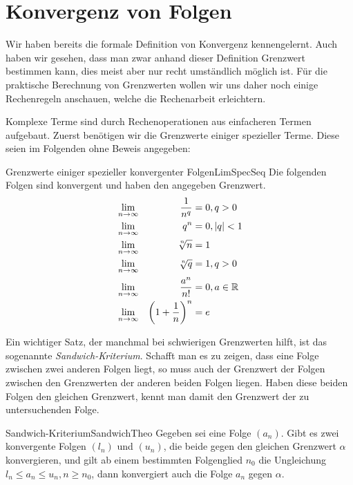 \section{Konvergenz von Folgen}

Wir haben bereits die formale Definition von Konvergenz kennengelernt. Auch haben wir gesehen, dass man zwar anhand dieser Definition Grenzwert bestimmen kann, dies meist aber nur recht umständlich möglich ist. Für die praktische Berechnung von Grenzwerten wollen wir uns daher noch einige Rechenregeln anschauen, welche die Rechenarbeit erleichtern.

Komplexe Terme sind durch Rechenoperationen aus einfacheren Termen aufgebaut. Zuerst benötigen wir die Grenzwerte einiger spezieller Terme. Diese seien im Folgenden ohne Beweis angegeben:

\begin{statement}{Grenzwerte einiger spezieller konvergenter Folgen}{LimSpecSeq}
	Die folgenden Folgen sind konvergent und haben den angegeben Grenzwert.
	\begin{alignat}{3}
		& \lim\limits_{n\to\infty} & \frac{1}{n^q}  & = 0, q > 0 \label{eq:LimitInv1nq} \\
		& \lim\limits_{n\to\infty} & q^n & = 0, |q| < 1 \\
		& \lim\limits_{n\to\infty} & \nroot{n}{n} & = 1 \\
		& \lim\limits_{n\to\infty} & \nroot{n}{q} & = 1, q > 0 \\
		& \lim\limits_{n\to\infty} & \frac{a^n}{n!} & = 0, a \in \R \label{eq:LimitPowerFactorial} \\
		& \lim\limits_{n\to\infty} & \left(1+\frac{1}{n}\right)^n & = e \label{eq:LimitExp}
	\end{alignat}
\end{statement}

Ein wichtiger Satz, der manchmal bei schwierigen Grenzwerten hilft, ist das sogenannte \emph{Sandwich-Kriterium}. Schafft man es zu zeigen, dass eine Folge zwischen zwei anderen Folgen liegt, so muss auch der Grenzwert der Folgen zwischen den Grenzwerten der anderen beiden Folgen liegen. Haben diese beiden Folgen den gleichen Grenzwert, kennt man damit den Grenzwert der zu untersuchenden Folge.

\begin{statement}{Sandwich-Kriterium}{SandwichTheo}
	Gegeben sei eine Folge $(a_n)$. Gibt es zwei konvergente Folgen $(l_n)$ und $(u_n)$, die beide gegen den gleichen Grenzwert $\alpha$ konvergieren, und gilt ab einem bestimmten Folgenglied $n_0$ die Ungleichung $l_n \le a_n \le u_n, n \ge n_0$, dann konvergiert auch die Folge $a_n$ gegen $\alpha$.
\end{statement}

